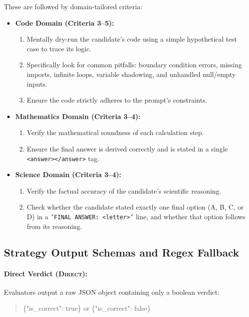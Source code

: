 These are followed by domain-tailored criteria:
\begin{itemize}[nosep, leftmargin=*]
  \item \textbf{Code Domain (Criteria 3--5):}
    \begin{enumerate}
      \item Mentally dry-run the candidate's code using a simple hypothetical test case to trace its logic.
      \item Specifically look for common pitfalls: boundary condition errors, missing imports, infinite loops, variable shadowing, and unhandled null/empty inputs.
      \item Ensure the code strictly adheres to the prompt's constraints.
    \end{enumerate}
  \item \textbf{Mathematics Domain (Criteria 3--4):}
    \begin{enumerate}
      \item Verify the mathematical soundness of each calculation step.
      \item Ensure the final answer is derived correctly and is stated in a single \texttt{<answer></answer>} tag.
    \end{enumerate}
  \item \textbf{Science Domain (Criteria 3--4):}
    \begin{enumerate}
      \item Verify the factual accuracy of the candidate's scientific reasoning.
      \item Check whether the candidate stated exactly one final option (A, B, C, or D) in a \texttt{'FINAL ANSWER: <letter>'} line, and whether that option follows from its reasoning.
    \end{enumerate}
\end{itemize}

\subsection{Strategy Output Schemas and Regex Fallback}
\paragraph{Direct Verdict (\textsc{Direct}):}
Evaluators output a raw JSON object containing only a boolean verdict:
\begin{quote}
\ttfamily \{"is\_correct": true\} \textrm{or} \{"is\_correct": false\}
\end{quote}

